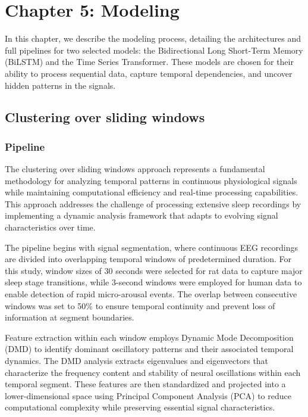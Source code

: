\documentclass[a4paper,12pt,twoside]{article}
\begin{document}
\vspace{0.5cm}
\noindent

\section{Chapter 5: Modeling}

In this chapter, we describe the modeling process, detailing the architectures and full pipelines for two selected models: the Bidirectional Long Short-Term Memory (BiLSTM) and the Time Series Transformer. These models are chosen for their ability to process sequential data, capture temporal dependencies, and uncover hidden patterns in the signals.

\subsection{Clustering over sliding windows}
\subsubsection{Pipeline}

The clustering over sliding windows approach represents a fundamental methodology for analyzing temporal patterns in continuous physiological signals while maintaining computational efficiency and real-time processing capabilities. This approach addresses the challenge of processing extensive sleep recordings by implementing a dynamic analysis framework that adapts to evolving signal characteristics over time.

The pipeline begins with signal segmentation, where continuous EEG recordings are divided into overlapping temporal windows of predetermined duration. For this study, window sizes of 30 seconds were selected for rat data to capture major sleep stage transitions, while 3-second windows were employed for human data to enable detection of rapid micro-arousal events. The overlap between consecutive windows was set to 50\% to ensure temporal continuity and prevent loss of information at segment boundaries.

Feature extraction within each window employs Dynamic Mode Decomposition (DMD) to identify dominant oscillatory patterns and their associated temporal dynamics. The DMD analysis extracts eigenvalues and eigenvectors that characterize the frequency content and stability of neural oscillations within each temporal segment. These features are then standardized and projected into a lower-dimensional space using Principal Component Analysis (PCA) to reduce computational complexity while preserving essential signal characteristics.
\end{document}
